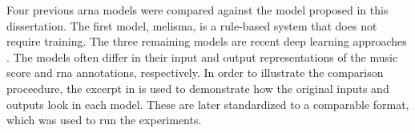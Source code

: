 
Four previous \gls{arna} models were compared against the
model proposed in this dissertation. The first model,
\gls{melisma}, is a rule-based system that does not require
training. The three remaining models are recent deep
learning approaches \parencite{chen2021attend,
micchi2021deep, mcleod2021modular}. The models often differ
in their input and output representations of the music score
and \gls{rna} annotations, respectively. In order to
illustrate the comparison proceedure, the excerpt in
 is used to demonstrate
how the original inputs and outputs look in each model.
These are later standardized to a comparable format, which
was used to run the experiments.

